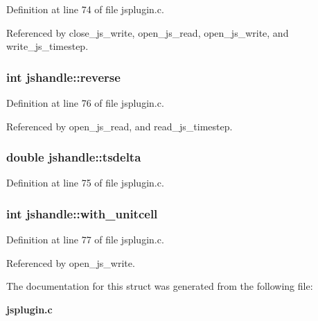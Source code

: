 Definition at line 74 of file jsplugin.c.

Referenced by close\_\-js\_\-write, open\_\-js\_\-read, open\_\-js\_\-write, and write\_\-js\_\-timestep.
\subsubsection{\setlength{\rightskip}{0pt plus 5cm}int jshandle::reverse}\label{structjshandle_m4}




Definition at line 76 of file jsplugin.c.

Referenced by open\_\-js\_\-read, and read\_\-js\_\-timestep.
\subsubsection{\setlength{\rightskip}{0pt plus 5cm}double jshandle::tsdelta}\label{structjshandle_m3}




Definition at line 75 of file jsplugin.c.
\subsubsection{\setlength{\rightskip}{0pt plus 5cm}int jshandle::with\_\-unitcell}\label{structjshandle_m5}




Definition at line 77 of file jsplugin.c.

Referenced by open\_\-js\_\-write.

The documentation for this struct was generated from the following file:\begin{CompactItemize}
\item 
{\bf jsplugin.c}\end{CompactItemize}
